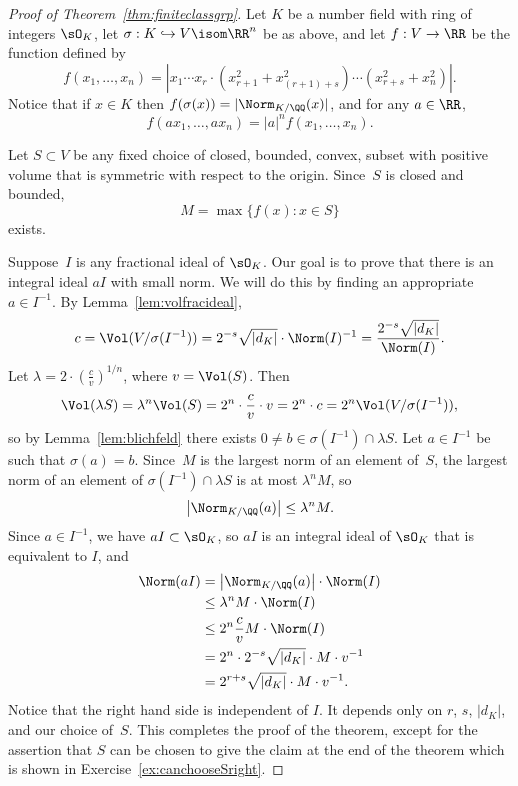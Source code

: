 \begin{proof}[Proof of Theorem~\ref{thm:finiteclassgrp}]
	Let $K$ be a number field with ring of integers $\sO_K$,
	let $\sigma:K \hookrightarrow V \isom \RR^n$ be as above,
	and let $f:V\to \RR$ be the function defined by
	$$
	f(x_1,\dots, x_n)
	= \left|
	x_1 \cdots x_r\cdot (x_{r+1}^2 + x_{(r+1)+s}^2)\cdots (x_{r+s}^2 + x_n^2)
	\right|.
	$$
	Notice that if $x\in K$ then $f(\sigma(x)) = |\Norm_{K/\QQ}(x)|$,
	and for any $a\in \RR$,
	$$
	f(ax_1, \dots,  ax_n) = |a|^n f(x_1,\dots, x_n).
	$$

	Let $S\subset V$ be any fixed choice of closed, bounded, convex, subset with
	positive volume that is symmetric with respect to the origin.
	Since~$S$ is closed and bounded,
	$$
	M = \max\{f(x) : x \in S\}
	$$
	exists.

	Suppose~$I$ is any  fractional ideal of $\sO_K$.  Our goal
	is to prove that there is an integral ideal $aI$ with small norm. We
	will do this by finding an appropriate $a\in I^{-1}$.
	By Lemma~\ref{lem:volfracideal},
	$$
	c = \Vol(V/\sigma(I^{-1}))
	= 2^{-s}\sqrt{|d_K|}\cdot \Norm(I)^{-1}
	= \frac{2^{-s} \sqrt{|d_K|}}{\Norm(I)}.
	$$
	Let $\lambda = 2\cdot\left(\frac{c}{v}\right)^{1/n}$, where $v=\Vol(S)$.
	Then
	$$
	\Vol(\lambda{} S) = \lambda^n \Vol(S)
	= 2^n\cdot \frac{c}{v} \cdot v
	= 2^n\cdot c
	= 2^n \Vol(V/\sigma(I^{-1})),
	$$
	so by Lemma~\ref{lem:blichfeld} there exists
	$0\neq b\in \sigma(I^{-1}) \cap \lambda S$.
	Let $a \in I^{-1}$ be such that $\sigma(a)=b$.
	Since~$M$ is the largest norm of an element of~$S$, the largest norm
	of an element of $\sigma(I^{-1})\cap  \lambda{}S$ is at most $\lambda^n M$,
	so
	$$
	\left|\Norm_{K/\QQ}(a)\right| \leq \lambda^n M.
	$$
	Since $a\in I^{-1}$, we have $aI \subset \sO_K$, so
	$aI$ is an integral ideal of $\sO_K$ that is equivalent to $I$, and
	\begin{align*}
	\Norm(aI) &= \left|\Norm_{K/\QQ}(a)\right|\cdot \Norm(I) \\
	&\leq \lambda^n M\cdot \Norm(I) \\
	&\leq 2^n \frac{c}{v} M \cdot \Norm(I) \\
	&= 2^n\cdot 2^{-s} \sqrt{|d_K|} \cdot M \cdot v^{-1} \\
	&= 2^{r+s} \sqrt{|d_K|} \cdot M \cdot v^{-1}.
	\end{align*}
	Notice that the right hand side is independent of $I$.  It
	depends only on $r$, $s$, $|d_K|$, and our choice of~$S$.
	This completes the proof of the theorem, except for
	the assertion that $S$ can be chosen to give the claim
	at the end of the theorem which is shown in Exercise~\ref{ex:canchooseSright}.
\end{proof}

